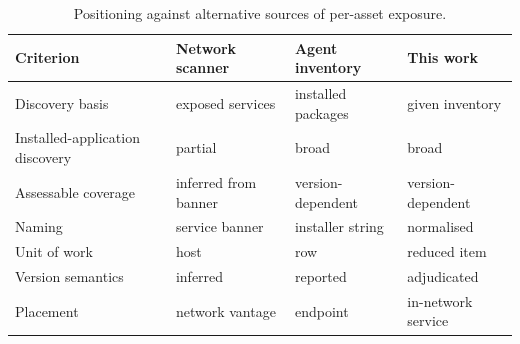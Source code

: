 \begin{table}[htbp]
\centering
\caption{Positioning against alternative sources of per-asset exposure.}
\label{tab:positioning}
\footnotesize
\begin{tabular}{l l l l}
\hline
Criterion & Network scanner & Agent inventory & This work \\
\hline
Discovery basis & exposed services & installed packages & given inventory \\
Installed-application discovery & partial & broad & broad \\
Assessable coverage & inferred from banner & version-dependent & version-dependent \\
Naming & service banner & installer string & normalised \\
Unit of work & host & row & reduced item \\
Version semantics & inferred & reported & adjudicated \\
Placement & network vantage & endpoint & in-network service \\
\hline
\end{tabular}
\end{table}
